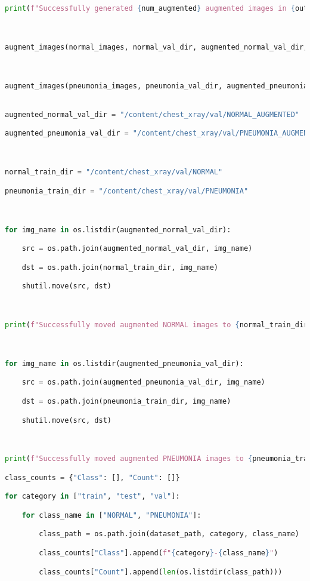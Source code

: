 \documentclass{article}
\begin{document}
\begin{lstlisting}[style=mystyle,language=Python]
    print(f"Successfully generated {num_augmented} augmented images in {output_dir}!")



augment_images(normal_images, normal_val_dir, augmented_normal_val_dir, target_augmented_NORMAL)



augment_images(pneumonia_images, pneumonia_val_dir, augmented_pneumonia_val_dir, target_augmented_PNEUMONIA)


augmented_normal_val_dir = "/content/chest_xray/val/NORMAL_AUGMENTED"

augmented_pneumonia_val_dir = "/content/chest_xray/val/PNEUMONIA_AUGMENTED"



normal_train_dir = "/content/chest_xray/val/NORMAL"

pneumonia_train_dir = "/content/chest_xray/val/PNEUMONIA"



for img_name in os.listdir(augmented_normal_val_dir):

    src = os.path.join(augmented_normal_val_dir, img_name)

    dst = os.path.join(normal_train_dir, img_name)

    shutil.move(src, dst)



print(f"Successfully moved augmented NORMAL images to {normal_train_dir}!")



for img_name in os.listdir(augmented_pneumonia_val_dir):

    src = os.path.join(augmented_pneumonia_val_dir, img_name)

    dst = os.path.join(pneumonia_train_dir, img_name)

    shutil.move(src, dst)



print(f"Successfully moved augmented PNEUMONIA images to {pneumonia_train_dir}!")

class_counts = {"Class": [], "Count": []}

for category in ["train", "test", "val"]:

    for class_name in ["NORMAL", "PNEUMONIA"]:

        class_path = os.path.join(dataset_path, category, class_name)

        class_counts["Class"].append(f"{category}-{class_name}")

        class_counts["Count"].append(len(os.listdir(class_path)))




\end{lstlisting}
\end{document}
